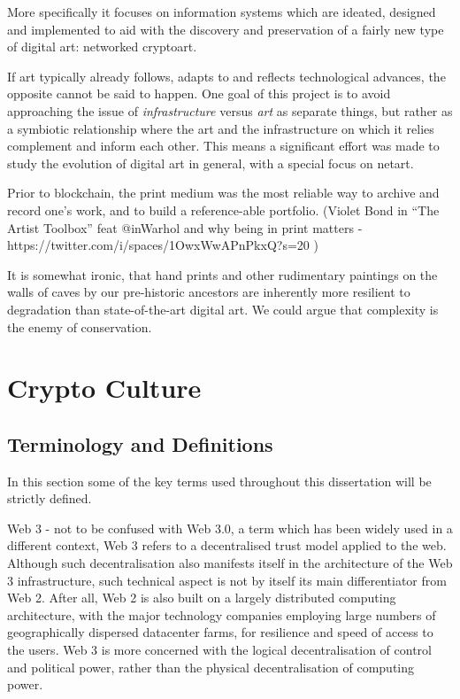 More specifically it focuses on information systems which are ideated, designed and implemented to aid with the discovery and preservation of a fairly new type of digital art: networked cryptoart. 



If art typically already follows, adapts to and reflects technological advances, the opposite cannot be said to happen. One goal of this project is to avoid approaching the issue of \emph{infrastructure} versus \emph{art} as separate things, but rather as a symbiotic relationship where the art and the infrastructure on which it relies complement and inform each other. This means a significant effort was made to study the evolution of digital art in general, with a special focus on netart. 

Prior to blockchain, the print medium was the most reliable way to archive and record one's work, and to build a reference-able portfolio. (Violet Bond in ``The Artist Toolbox'' feat @inWarhol and why being in print matters - https://twitter.com/i/spaces/1OwxWwAPnPkxQ?s=20 )

It is somewhat ironic, that hand prints and other rudimentary paintings on the walls of caves by our pre-historic ancestors are inherently more resilient to degradation than state-of-the-art digital art. We could argue that complexity is the enemy of conservation.


\section{Crypto Culture}


\subsection{Terminology and Definitions}

In this section some of the key terms used throughout this dissertation will be strictly defined.

Web 3 - not to be confused with Web 3.0, a term which has been widely used in a different context, Web 3 refers to a decentralised trust model applied to the web. Although such decentralisation also manifests itself in the architecture of the Web 3 infrastructure, such technical aspect is not by itself its main differentiator from Web 2. After all, Web 2 is also built on a largely distributed computing architecture, with the major technology companies employing large numbers of geographically dispersed datacenter farms, for resilience and speed of access to the users. Web 3 is more concerned with the logical decentralisation of control and political power, rather than the physical decentralisation of computing power.

